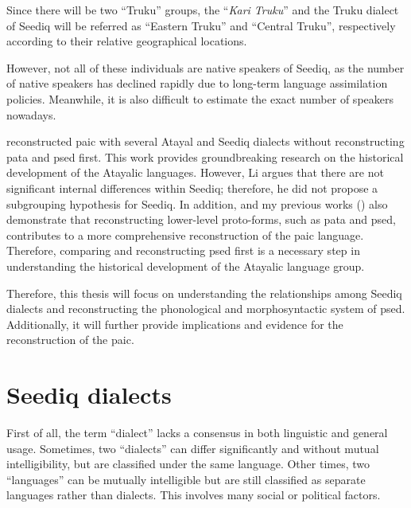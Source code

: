 Since there will be two ``Truku'' groups, the ``\textit{Kari Truku}'' and the Truku dialect of Seediq will be referred as ``Eastern Truku'' and ``Central Truku'', respectively according to their relative geographical locations.

 However, not all of these individuals are native speakers of Seediq, as the number of native speakers has declined rapidly due to long-term language assimilation policies. Meanwhile, it is also difficult to estimate the exact number of speakers nowadays.

\textcite{li1981paic} reconstructed \ac{paic} with several Atayal and Seediq dialects without reconstructing \ac{pata} and \ac{psed} first. This work provides groundbreaking research on the historical development of the Atayalic languages. However, Li argues that there are not significant internal differences within Seediq; therefore, he did not propose a subgrouping hypothesis for Seediq. In addition, \textcite{goderich2020phd} and my previous works (\cite{song2022Aicd,song2023Aicgprime,song2024Aicg}) also demonstrate that reconstructing lower-level proto-forms, such as \acl{pata} and \acl{psed}, contributes to a more comprehensive reconstruction of the \acl{paic} language. Therefore, comparing and reconstructing \acl{psed} first is a necessary step in understanding the historical development of the Atayalic language group.

Therefore, this thesis will focus on understanding the relationships among Seediq dialects and reconstructing the phonological and morphosyntactic system of \acl{psed}. Additionally, it will further provide implications and evidence for the reconstruction of the \acl{paic}.


\section{Seediq dialects}

First of all, the term ``dialect'' lacks a consensus in both linguistic and general usage. Sometimes, two ``dialects'' can differ significantly and without mutual intelligibility, but are classified under the same language. Other times, two ``languages'' can be mutually intelligible but are still classified as separate languages rather than dialects. This involves many social or political factors. 

